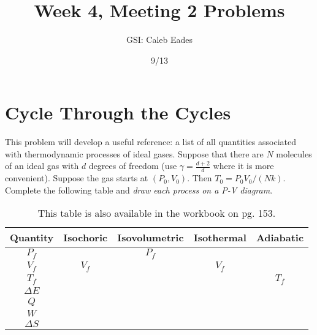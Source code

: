 \documentclass{article}
\begin{document}
\title{Week 4, Meeting 2 Problems}
\author{GSI: Caleb Eades}
\date{9/13}
\maketitle

\section{Cycle Through the Cycles}

This problem will develop a useful reference: a list of all quantities associated with thermodynamic processes of ideal gases. Suppose that there are $N$ molecules of an ideal gas with $d$ degrees of freedom (use $\gamma = \frac{d+2}{d}$ where it is more convenient). Suppose the gas starts at $(P_0,V_0)$. Then $T_0 = P_0V_0/(Nk)$. Complete the following table and \textit{draw each process on a P-V diagram}.

\def\arraystretch{2.5}
\begin{table}[h]
	\begin{center}
	\caption{This table is also available in the workbook on pg. 153.}
	
	\begin{tabular}{| >{\Large}c|c|c|c|c|}
		\hline
		\normalsize{\textbf{Quantity}} & \textbf{Isochoric} & \textbf{Isovolumetric} & \textbf{Isothermal} & \textbf{Adiabatic} \\ \hline
		$P_f$             &                   & $P_f$                  &                     &                    \\ \hline
		$V_f$             & $V_f$             &                        & $V_f$               &                    \\ \hline
		$T_f$             &                   &                        &                     & $T_f$              \\ \hline
		$\Delta E$        &                   &                        &                     &                    \\ \hline
		$Q$               &                   &                        &                     &                    \\ \hline
		$W$               &                   &                        &                     &                    \\ \hline
		$\Delta S$        &                   &                        &                     &                    \\ \hline
	\end{tabular}
	\end{center}
\end{table}
\end{document}
